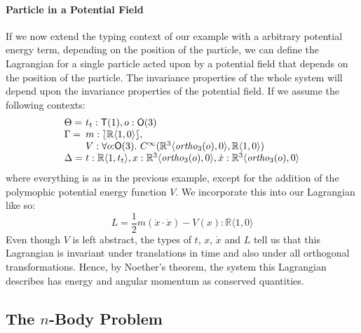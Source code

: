 \documentclass[preprint]{sigplanconf}
\newcommand{\typeOfCartSp}[1]{\lbag #1 \rbag}
\theoremstyle{examplestyle}
\begin{document}
\paragraph{Particle in a Potential Field}

If we now extend the typing context of our example with a arbitrary
potential energy term, depending on the position of the particle, we
can define the Lagrangian for a single particle acted upon by a
potential field that depends on the position of the particle. The
invariance properties of the whole system will depend upon the
invariance properties of the potential field. If we assume the
following contexts:
\begin{displaymath}
  \begin{array}{l@{\hspace{0.3em}}l}
    \Theta = & t_t : \mathsf{T}(1), o : \mathsf{O}(3) \\
    \Gamma = &
    \begin{array}[t]{@{}l}
      m : \typeOfCartSp{\mathbb{R}\langle 1, 0 \rangle}, \\
      V : \forall o \mathord: \mathsf{O}(3).~C^\infty(\mathbb{R}^3\langle \mathit{ortho}_3(o), 0 \rangle, \mathbb{R}\langle 1, 0 \rangle)
    \end{array}\\
    \Delta = & t : \mathbb{R}\langle 1, t_t \rangle, x : \mathbb{R}^3\langle \mathit{ortho}_3(o), 0 \rangle, \dot{x} : \mathbb{R}^3\langle \mathit{ortho}_3(o), 0 \rangle
  \end{array}
\end{displaymath}
where everything is as in the previous example, except for the
addition of the polymophic potential energy function $V$. We
incorporate this into our Lagrangian like so:
\begin{displaymath}
  L = \frac{1}{2}m(\dot{x} \cdot \dot{x}) - V(x) : \mathbb{R}\langle 1, 0 \rangle
\end{displaymath}
Even though $V$ is left abstract, the types of $t$, $x$, $\dot{x}$ and
$L$ tell us that this Lagrangian is invariant under translations in
time and also under all orthogonal transformations. Hence, by
Noether's theorem, the system this Lagrangian describes has energy and
angular momentum as conserved quantities.

\subsection{The $n$-Body Problem}
\end{document}
